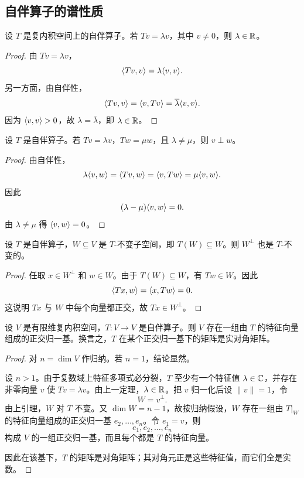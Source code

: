 \subsection{自伴算子的谱性质}

\begin{theorem}
设 $T$ 是复内积空间上的自伴算子。若 $Tv=\lambda v$，其中 $v\ne 0$，则 $\lambda\in\mathbb{R}$。
\end{theorem}

\begin{proof}
由 $Tv=\lambda v$，
\[
\langle Tv, v \rangle=\lambda\langle v, v \rangle.
\]
另一方面，由自伴性，
\[
\langle Tv, v \rangle=\langle v, Tv \rangle=\overline{\lambda}\langle v, v \rangle.
\]
因为 $\langle v, v \rangle>0$，故 $\lambda=\overline{\lambda}$，即 $\lambda\in\mathbb{R}$。
\end{proof}

\begin{theorem}
设 $T$ 是自伴算子。若 $Tv=\lambda v$，$Tw=\mu w$，且 $\lambda\ne\mu$，则 $v\perp w$。
\end{theorem}

\begin{proof}
由自伴性，
\[
\lambda\langle v, w \rangle=\langle Tv, w \rangle=\langle v, Tw \rangle=\mu\langle v, w \rangle.
\]
因此
\[
(\lambda-\mu)\langle v, w \rangle=0.
\]
由 $\lambda\ne\mu$ 得 $\langle v, w \rangle=0$。
\end{proof}

\begin{lemma}
设 $T$ 是自伴算子，$W\subseteq V$ 是 $T$-不变子空间，即 $T(W)\subseteq W$。则 $W^{\perp}$ 也是 $T$-不变的。
\end{lemma}

\begin{proof}
任取 $x\in W^{\perp}$ 和 $w\in W$。由于 $T(W)\subseteq W$，有 $Tw\in W$。因此
\[
\langle Tx, w \rangle=\langle x, Tw \rangle=0.
\]
这说明 $Tx$ 与 $W$ 中每个向量都正交，故 $Tx\in W^{\perp}$。
\end{proof}

\begin{theorem}
设 $V$ 是有限维复内积空间，$T:V\to V$ 是自伴算子。则 $V$ 存在一组由 $T$ 的特征向量组成的正交归一基。换言之，$T$ 在某个正交归一基下的矩阵是实对角矩阵。
\end{theorem}

\begin{proof}
对 $n=\dim V$ 作归纳。若 $n=1$，结论显然。

设 $n>1$。由于复数域上特征多项式必分裂，$T$ 至少有一个特征值 $\lambda\in\mathbb{C}$，并存在非零向量 $v$ 使 $Tv=\lambda v$。由上一定理，$\lambda\in\mathbb{R}$。把 $v$ 归一化后设 $\|v\|=1$，令
\[
W=v^{\perp}.
\]
由上引理，$W$ 对 $T$ 不变。又 $\dim W=n-1$，故按归纳假设，$W$ 存在一组由 $T|_W$ 的特征向量组成的正交归一基 $e_2,\dots,e_n$。令 $e_1=v$，则
\[
e_1,e_2,\dots,e_n
\]
构成 $V$ 的一组正交归一基，而且每个都是 $T$ 的特征向量。

因此在该基下，$T$ 的矩阵是对角矩阵；其对角元正是这些特征值，而它们全是实数。
\end{proof}

